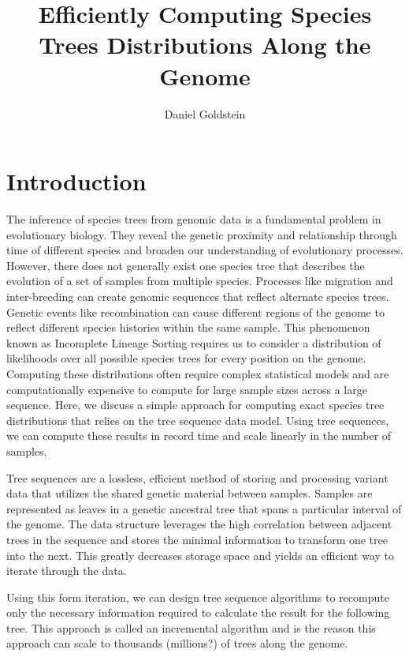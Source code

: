 \documentclass{article}
\begin{document}
\title{Efficiently Computing Species Trees Distributions Along the Genome}
\author{Daniel Goldstein}
\maketitle


\section{Introduction}

The inference of species trees from genomic data is a fundamental problem in
evolutionary biology. They reveal the genetic proximity and relationship
through time of different species and broaden our understanding of 
evolutionary processes. However, there does not generally exist one 
species tree that describes the evolution of a set of samples from multiple 
species. Processes like migration and inter-breeding can create genomic
sequences that reflect alternate species trees.
Genetic events like recombination can cause
different regions of the genome to reflect different species histories 
within the same sample. This phenomenon known as Incomplete Lineage Sorting
requires us to consider a distribution of likelihoods over all possible
species trees for every position on the genome. Computing these
distributions often require complex statistical models and are
computationally expensive to compute for large sample sizes across a large
sequence. Here, we discuss a simple approach for computing exact species
tree distributions that relies on the tree sequence data model. Using tree
sequences, we can compute these results in record time and scale linearly
in the number of samples.

Tree sequences are a lossless, efficient method of storing and processing
variant data that utilizes the shared genetic material between samples.
Samples are represented as leaves in a genetic ancestral tree that spans
a particular interval of the genome. The data structure
leverages the high correlation between adjacent trees in the sequence and
stores the minimal information to transform one tree into the next. This
greatly decreases storage space and yields an efficient way to iterate through
the data.

Using this form iteration, we can design tree sequence algorithms to
recompute only the necessary information required to calculate the result
for the following tree. This approach is called an incremental algorithm
and is the reason this approach can scale to thousands (millions?) of trees
along the genome.
\end{document}
